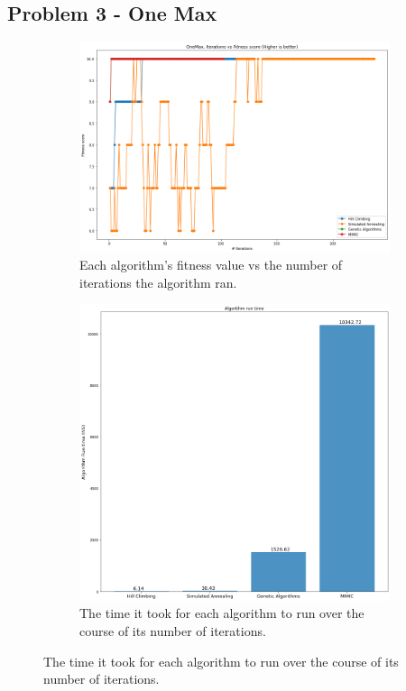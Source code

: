\documentclass[
letterpaper, %
]{IEEEtran}
\begin{document}
	\subsection{Problem 3 - One Max}
	\begin{figure}[h]
		\begin{subfigure}{.5\textwidth}
			\centering
			\includegraphics[width=.8\linewidth]{./images/exp3FitnessScore.png}
			\caption{Each algorithm's fitness value vs the number of iterations the algorithm ran.}
			\label{fig:exp3Score}
		\end{subfigure}
		\begin{subfigure}{.5\textwidth}
			\centering
			\includegraphics[width=.8\linewidth]{./images/exp3Runtime.png}
			\caption{The time it took for each algorithm to run over the course of its number of iterations.}
			\label{fig:exp3Runtime}
		\end{subfigure}
	\end{figure}
\end{document}

